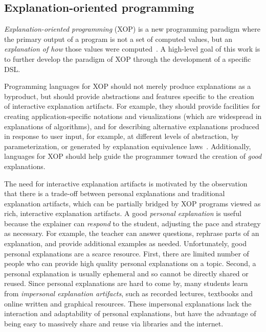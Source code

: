 \documentclass[sigconf]{acmart}
\begin{document}
\subsection{Explanation-oriented programming}
\label{sec:back:xop}

\emph{Explanation-oriented programming} (XOP) is a new programming paradigm
where the primary output of a program is not a set of computed values, but an
\emph{explanation of how} those values were
computed~\cite{EW08vl,EW09dsl,EW09vl,WE11dsl,EW13jvlc}.
%
A high-level goal of this work is to further develop the paradigm of XOP
through the development of a specific DSL.


Programming languages for XOP should not merely produce explanations as a
byproduct, but should provide abstractions and features specific to the
creation of interactive explanation artifacts. For example, they should provide
facilities for creating application-specific notations and visualizations
(which are widespread in explanations of algorithms), and for describing
alternative explanations produced in response to user input, for example, at
different levels of abstraction, by parameterization, or generated by
explanation equivalence laws~\cite{EW13jvlc}. Additionally, languages for XOP
should help guide the programmer toward the creation of \emph{good}
explanations.


The need for interactive explanation artifacts is motivated by the observation
that there is a trade-off between personal explanations and traditional
explanation artifacts, which can be partially bridged by XOP programs viewed as
rich, interactive explanation artifacts.
%
A good \emph{personal explanation} is useful because the explainer can
\emph{respond} to the student, adjusting the pace and strategy as necessary.
For example, the teacher can answer questions, rephrase parts of an
explanation, and provide additional examples as needed.
%
Unfortunately, good personal explanations are a scarce resource. First, there
are limited number of people who can provide high quality personal explanations
on a topic. Second, a personal explanation is usually ephemeral and so cannot
be directly shared or reused.
%
Since personal explanations are hard to come by, many students learn from
\emph{impersonal explanation artifacts}, such as recorded lectures, textbooks
and online written and graphical resources.
%
These impersonal explanations lack the interaction and adaptability of personal
explanations, but have the advantage of being easy to massively share and reuse
via libraries and the internet.
\end{document}
